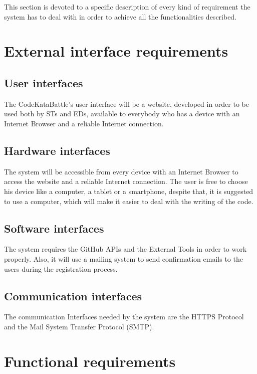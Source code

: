 This section is devoted to a specific description of every kind of requirement the system has to deal with in order to achieve all the functionalities described.


\section{External interface requirements}
\label{sec:external_interface_requirements}%

\subsection{User interfaces}
\label{subsec:user_interfaces}%
The CodeKataBattle’s user interface will be a website, developed in order to be used both by STs and EDs, available to everybody who has a device with an Internet Browser and a reliable Internet connection.

\subsection{Hardware interfaces}
\label{subsec:hardware_interfaces}%
The system will be accessible from every device with an Internet Browser to access the website and a reliable Internet connection.
The user is free to choose his device like a computer, a tablet or a smartphone, despite that, it is suggested to use a computer, which will make it easier to deal with the writing of the code.


\subsection{Software interfaces}
\label{subsec:software_interfaces}%
The system requires the GitHub APIs and the External Tools in order to work properly. Also, it will use a mailing system to send confirmation emails to the users during the registration process.    

\subsection{Communication interfaces}
\label{subsec:communication_interfaces}%
The communication Interfaces needed by the system are the HTTPS Protocol and the Mail System Transfer Protocol (SMTP).

\section{Functional requirements}
\label{sec:functional_requirements}%

